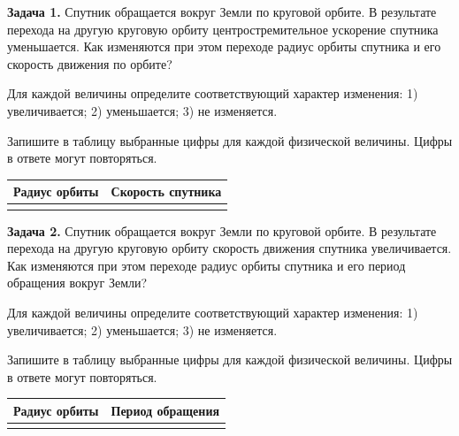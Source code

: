 
\begin{taskbasic}[code={\label{task:gravity_v1_n6}}]
\textbf{Задача 1.} Спутник обращается вокруг Земли по круговой орбите. В результате перехода на другую круговую орбиту центростремительное ускорение спутника уменьшается. Как изменяются при этом переходе радиус орбиты спутника и его скорость движения по орбите?

Для каждой величины определите соответствующий характер изменения:
1) увеличивается;
2) уменьшается;
3) не изменяется.

Запишите в таблицу выбранные цифры для каждой физической величины. Цифры в ответе могут повторяться.
\begin{center}
\begin{tabular}{|c|c|}
\hline
Радиус орбиты & Скорость спутника \\ \hline
 & \\ \hline
\end{tabular}
\end{center}

\end{taskbasic}

\begin{taskbasic}[code={\label{task:gravity_v2_n6}}]
\textbf{Задача 2.} Спутник обращается вокруг Земли по круговой орбите. В результате перехода на другую круговую орбиту скорость движения спутника увеличивается. Как изменяются при этом переходе радиус орбиты спутника и его период обращения вокруг Земли?

Для каждой величины определите соответствующий характер изменения:
1) увеличивается;
2) уменьшается;
3) не изменяется.

Запишите в таблицу выбранные цифры для каждой физической величины. Цифры в ответе могут повторяться.
\begin{center}
\begin{tabular}{|c|c|}
\hline
Радиус орбиты & Период обращения \\ \hline
 & \\ \hline
\end{tabular}
\end{center}

\end{taskbasic}

